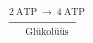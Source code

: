 \documentclass[preview]{standalone}
\begin{document}
\begin{align*}
\xrightarrow[\text{Glükolüüs}]{2\:\text{ATP}\:\rightarrow\:4\:\text{ATP}}
\end{align*}
\end{document}
